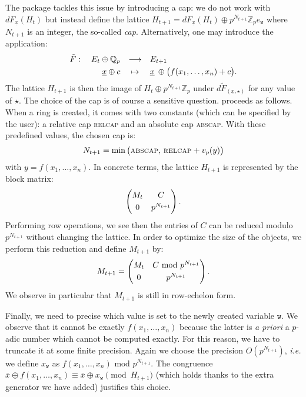 \documentclass[sigconf]{acmart}
\newcommand{\Z}{\mathbb Z}
\newcommand{\Zp}{\Z_p}
\newcommand{\Q}{\mathbb Q}
\newcommand{\Qp}{\Q_p}
\newcommand{\ttw}{\texttt{w}\xspace}
\newcommand{\ZpLC}{\text{\color{output} \rm \tt ZpLC}\xspace}
\theoremstyle{definition}
\begin{document}
The package \ZpLC tackles this issue by introducing a cap: we do not 
work with $dF_{\underline x}(H_t)$ but instead define the lattice
$H_{t+1} = dF_{\underline x}(H_t) \oplus p^{N_{t+1}} \Zp e_\ttw$
where $N_{t+1}$ is an integer, the so-called \emph{cap}.
Alternatively, one may introduce the application:
\begin{equation}
\label{eq:tildeF}
\begin{array}{rcl}
\tilde F: \quad E_t \oplus \Qp & \longrightarrow & E_{t+1} \smallskip \\
\underline x \oplus c & \mapsto & \underline x \:\oplus 
\big(f(x_1, \ldots, x_n) + c\big).
\end{array}
\end{equation}
The lattice $H_{t+1}$ is then the image of $H_t \oplus p^{N_{t+1}}
\Zp$ under $d\tilde F_{(\underline x, \star)}$ for any value of $\star$.
The choice of the 
cap is of course a sensitive question. \ZpLC proceeds as follows. When a 
ring is created, it comes with two constants (which can be specified by 
the user): a relative cap \textsc{relcap} and an absolute cap 
\textsc{abscap}. With these predefined values, the chosen cap is:
\begin{equation}
\label{eq:cap}
N_{t+1} = 
\min\big(\textsc{abscap},\, \textsc{relcap} + v_p(y)\big)
\end{equation}
with $y = f(x_1, \ldots, x_n)$.
In concrete terms, the lattice $H_{t+1}$ is represented by the block 
matrix:
$$\left(\begin{matrix}
M_t & C \smallskip \\ 0 & p^{N_{t+1}}
\end{matrix}\right).$$
Performing row operations, we see then the entries of $C$ can be
reduced modulo $p^{N_{t+1}}$ without changing the lattice. In order
to optimize the size of the objects, we perform this reduction and
define $M_{t+1}$ by:
$$M_{t+1} = \left(\begin{matrix}
M_t & C \text{ mod } p^{N_{t+1}} \smallskip \\ 0 & p^{N_{t+1}}
\end{matrix}\right).$$
We observe in particular that $M_{t+1}$ is still in row-echelon form.

Finally, we need to precise which value is set to the newly created 
variable $\ttw$. We observe that it cannot be exactly $f(x_1, \ldots, 
x_n)$ because the latter is \emph{a priori} a $p$-adic number which 
cannot be computed exactly. For this reason, we have to truncate it at 
some finite precision. Again we choose the precision $O(p^{N_{t+1}})$,
\emph{i.e.} we define $x_\ttw$ as $f(x_1, \ldots, x_n) \text{ mod } 
p^{N_{t+1}}$. 
The congruence
$\bar x \oplus f(x_1, \ldots, x_n) \equiv
\bar x \oplus x_\ttw \pmod{H_{t+1}}$
(which holds thanks to the extra generator we have added) justifies
this choice.
\end{document}
